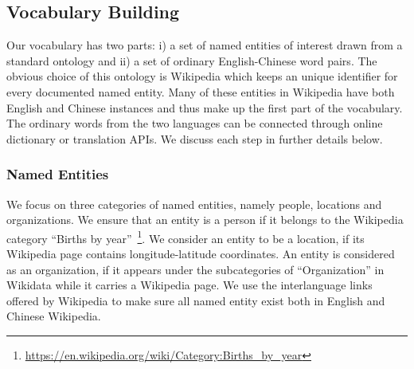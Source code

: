 
\subsection{Vocabulary Building}
\label{sec:vocab}
Our vocabulary has two parts: i) a set of named entities of interest
drawn from a standard ontology and ii) a set of ordinary English-Chinese
word pairs.
The obvious choice of this ontology is Wikipedia which keeps
an unique identifier for every documented named entity.
Many of these entities in Wikipedia have both English and Chinese instances and thus
make up the first part of the vocabulary.
The ordinary words from
the two languages can be connected through online dictionary or translation APIs.
We discuss each step in further details below.

\subsubsection{Named Entities}

We focus on three categories of named entities, namely people, locations and
organizations.
We ensure that an entity is a person if it belongs to the Wikipedia category
``Births by year''~\footnote{\url{https://en.wikipedia.org/wiki/Category:Births_by_year}}.
We consider an entity to be a location, if its Wikipedia page contains
longitude-latitude coordinates. An entity is considered as an organization,
if it appears under the subcategories of ``Organization'' in Wikidata while
it carries a Wikipedia page.
We use the interlanguage links offered by Wikipedia to make sure all named entity exist both in English and Chinese Wikipedia.



